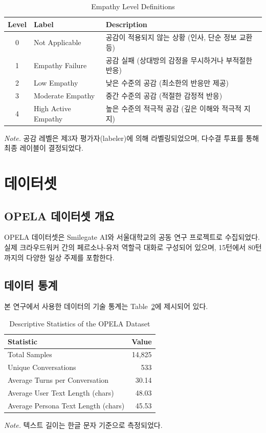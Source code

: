 \documentclass[12pt, a4paper]{article}
\begin{document}
\begin{table}[H]
\centering
\caption{Empathy Level Definitions}
\label{tab:empathy_levels}
\begin{tabular}{clp{8cm}}
\toprule
\textbf{Level} & \textbf{Label} & \textbf{Description} \\
\midrule
0 & Not Applicable & 공감이 적용되지 않는 상황 (인사, 단순 정보 교환 등) \\
1 & Empathy Failure & 공감 실패 (상대방의 감정을 무시하거나 부적절한 반응) \\
2 & Low Empathy & 낮은 수준의 공감 (최소한의 반응만 제공) \\
3 & Moderate Empathy & 중간 수준의 공감 (적절한 감정적 반응) \\
4 & High Active Empathy & 높은 수준의 적극적 공감 (깊은 이해와 적극적 지지) \\
\bottomrule
\end{tabular}

\vspace{0.5em}
\footnotesize\textit{Note.} 공감 레벨은 제3자 평가자(labeler)에 의해 라벨링되었으며, 다수결 투표를 통해 최종 레이블이 결정되었다.
\end{table}

\section{데이터셋}

\subsection{OPELA 데이터셋 개요}
OPELA 데이터셋은 Smilegate AI와 서울대학교의 공동 연구 프로젝트로 수집되었다.
실제 크라우드워커 간의 페르소나-유저 역할극 대화로 구성되어 있으며, 
15턴에서 80턴까지의 다양한 일상 주제를 포함한다.

\subsection{데이터 통계}
본 연구에서 사용한 데이터의 기술 통계는 Table~\ref{tab:data_stats}에 제시되어 있다.

\begin{table}[H]
\centering
\caption{Descriptive Statistics of the OPELA Dataset}
\label{tab:data_stats}
\begin{tabular}{lr}
\toprule
\textbf{Statistic} & \textbf{Value} \\
\midrule
Total Samples & 14,825 \\
Unique Conversations & 533 \\
Average Turns per Conversation & 30.14 \\
Average User Text Length (chars) & 48.03 \\
Average Persona Text Length (chars) & 45.53 \\
\bottomrule
\end{tabular}

\vspace{0.5em}
\footnotesize\textit{Note.} 텍스트 길이는 한글 문자 기준으로 측정되었다.
\end{table}
\end{document}
